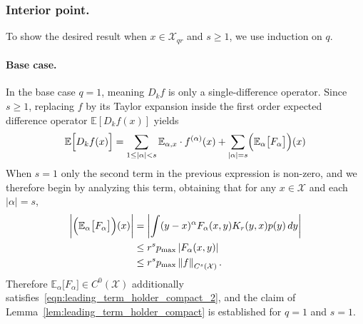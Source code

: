 \documentclass{article}
\newcommand{\abs}[1]{\left \lvert #1 \right \rvert}
\newcommand{\norm}[1]{\left \lVert #1 \right \rVert}
\newcommand{\1}{\mathbf{1}}
\newcommand{\Xset}{\mathcal{X}}
\newcommand{\Ebb}{\mathbb{E}}
\theoremstyle{alden}
\theoremstyle{aldenthm}
\theoremstyle{definition}
\theoremstyle{remark}
\begin{document}
\subsubsection{Interior point.}
To show the desired result when $x \in \Xset_{qr}$ and $s \geq 1$, we use induction on $q$. 

\paragraph{Base case.}
In the base case $q = 1$, meaning $D_kf$ is only a single-difference operator.
Since $s \geq 1$, replacing $f$ by its Taylor expansion inside the first order expected difference operator $\Ebb[D_kf(x)]$ yields
\begin{equation}
\label{eqn:leading_term_holder_compact_pf1}
\Ebb\Bigl[D_kf(x)\Bigr] = \sum_{1 \leq \abs{\alpha} < s} \Ebb_{\alpha,x} \cdot f^{(\alpha)}(x)  + \sum_{\abs{\alpha} = s} \Bigl(\Ebb_{\alpha}\bigl[F_{\alpha}\bigr]\Bigr)(x)
\end{equation}
When $s = 1$ only the second term in the previous expression is non-zero, and we therefore begin by analyzing this term, obtaining that for any $x \in \Xset$ and each $\abs{\alpha} = s$,
\begin{align}
\biggl|\Bigl(\Ebb_{\alpha}\bigl[F_{\alpha}\bigr]\Bigr)(x)\biggr| & = \biggl|\int (y - x)^{\alpha} F_{\alpha}(x,y) K_r(y,x) p(y) \,dy\biggr| \nonumber \\
& \leq r^s p_{\max} \abs{F_{\alpha}(x,y)} \nonumber \\
& \leq r^s p_{\max} \norm{f}_{C^s(\Xset)}. \label{eqn:leading_term_holder_compact_pf2}
\end{align}
Therefore $\Ebb_{\alpha}\bigl[F_{\alpha}\bigr] \in C^0(\Xset)$ additionally satisfies~\eqref{eqn:leading_term_holder_compact_2}, and the claim of Lemma~\ref{lem:leading_term_holder_compact} is established for $q = 1$ and $s = 1$.
\end{document}
